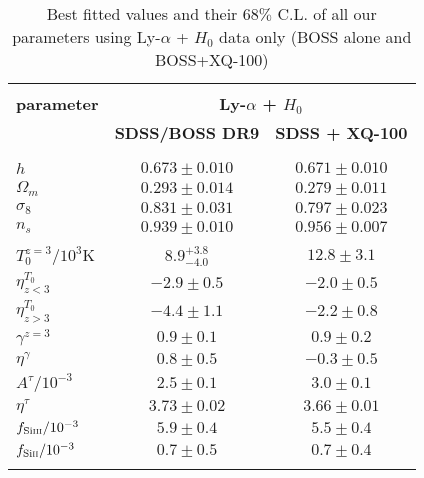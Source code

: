 \begin{table}
\begin{center}
\begin{tabular}{lcc}
\hline \\[-10pt]
\textbf{parameter} & \multicolumn{2}{c}{\textbf{Ly-$\alpha$ + $H_0$}} \\[2pt]
 & \textbf{SDSS/BOSS DR9} & \textbf{SDSS + XQ-100}\\[2pt]
\hline \\[-10pt]
\\ [2pt]
$h$ & $0.673 \pm 0.010$ & $0.671 \pm 0.010$ \\[2pt]
$\Omega_m$ & $0.293 \pm 0.014$ & $0.279 \pm 0.011$ \\[2pt]
$\sigma_8$ & $0.831 \pm 0.031$ & $0.797 \pm 0.023$ \\[2pt]
$n_s$ & $0.939 \pm 0.010$ & $0.956 \pm 0.007$ \\[2pt]
\hline \\[-10pt]
$T_0^{z=3}/10^3\mathrm{K}$ & $8.9^{+3.8}_{-4.0}$ & $12.8 \pm 3.1$ \\[2pt]
$\eta^{T_0}_{z<3}$ & $-2.9 \pm 0.5$ & $-2.0 \pm 0.5$ \\[2pt]
$\eta^{T_0}_{z>3}$ & $-4.4 \pm 1.1$ & $-2.2 \pm 0.8$ \\[2pt]
$\gamma^{z=3}$ & $0.9 \pm 0.1$ & $0.9 \pm 0.2$ \\[2pt]
$\eta^{\gamma}$ & $0.8 \pm 0.5$ & $-0.3 \pm 0.5$ \\[2pt]
$A^{\tau}/10^{-3}$ & $2.5 \pm 0.1$ & $3.0 \pm 0.1$ \\[2pt]
$\eta^{\tau}$ & $3.73 \pm 0.02$ & $3.66 \pm 0.01$ \\[2pt]
$f_{\mathrm{Si}\textsc{iii}}/10^{-3}$ & $5.9 \pm 0.4$ & $5.5 \pm 0.4$ \\[2pt]
$f_{\mathrm{Si}\textsc{ii}}/10^{-3}$ & $0.7 \pm 0.5$ & $0.7 \pm 0.4$ \\[2pt]
\hline \\[-10pt]
\end{tabular}
\end{center}
\caption{Best fitted values and their $68\%$ C.L. of all our parameters using Ly-$\alpha$ + $H_0$ data only (BOSS alone and BOSS+XQ-100)}
\label{tab:best_fit}
\end{table}


